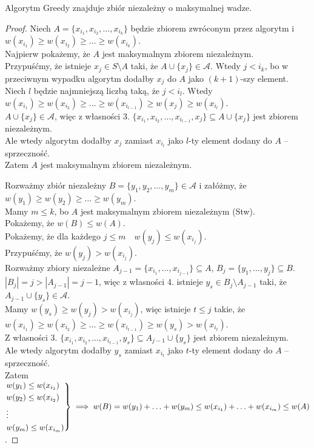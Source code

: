 \begin{theorem}
	Algorytm Greedy znajduje zbiór niezależny o maksymalnej wadze.
\end{theorem}
\begin{proof}
	Niech $A = \{x_{i_1}, x_{i_2}, \ldots, x_{i_k}\}$ będzie zbiorem zwróconym przez algorytm i $w(x_{i_1}) \geq w(x_{i_2}) \geq \ldots \geq w(x_{i_k})$.\\
	Najpierw pokażemy, że $A$ jest maksymalnym zbiorem niezależnym.\\
	Przypuśćmy, że istnieje $x_j \in S \setminus A$ taki, że $A \cup \{x_j\} \in \mathcal{A}$.
	Wtedy $j < i_k$, bo w przeciwnym wypadku algorytm dodałby $x_j$ do $A$ jako $(k+1)$-szy element.\\
	Niech $l$ będzie najmniejszą liczbą taką, że $j < i_l$.
	Wtedy $w(x_{i_1}) \geq w(x_{i_2}) \geq \ldots \geq w(x_{i_{l-1}}) \geq w(x_j) \geq w(x_{i_l})$.\\
	$A \cup \{x_j\} \in \mathcal{A}$, więc z własności 3. $\{x_{i_1}, x_{i_2}, \ldots, x_{i_{l-1}}, x_j\} \subseteq A \cup \{x_j\}$ jest zbiorem niezależnym.\\
	Ale wtedy algorytm dodałby $x_j$ zamiast $x_{i_l}$ jako $l$-ty element dodany do $A$ -- sprzeczność.\\
	Zatem $A$ jest maksymalnym zbiorem niezależnym.
	
	Rozważmy zbiór niezależny $B = \{y_1, y_2, \ldots, y_m\} \in \mathcal{A}$ i załóżmy, że $w(y_1) \geq w(y_2) \geq \ldots \geq w(y_m)$.\\
	Mamy $m \leq k$, bo $A$ jest maksymalnym zbiorem niezależnym (Stw).\\
	Pokażemy, że $w(B) \leq w(A)$.\\
	Pokażemy, że dla każdego $j \leq m \quad w(y_j) \leq w(x_{i_j})$.\\
	Przypuśćmy, że $w(y_j) > w(x_{i_j})$.\\
	Rozważmy zbiory niezależne $A_{j-1} = \{x_{i_1}, \ldots, x_{i_{j-1}}\} \subseteq A$, $B_j = \{y_1, \ldots, y_j\} \subseteq B$.\\
	$|B_j| = j > |A_{j-1}| = j-1$, więc z własności 4. istnieje $y_s \in B_j \setminus A_{j-1}$ taki, że $A_{j-1} \cup \{y_s\} \in \mathcal{A}$.\\
	Mamy $w(y_s) \geq w(y_j) > w(x_{i_j})$, więc istnieje $t \leq j$ takie, że $w(x_{i_1}) \geq w(x_{i_2}) \geq \ldots \geq w(x_{i_{t-1}}) \geq w(y_s) > w(x_{i_t})$.\\
	Z własności 3. $\{x_{i_1}, x_{i_2}, \ldots, x_{i_{t-1}}, y_s\} \subseteq A_{j-1} \cup \{y_s\}$ jest zbiorem niezależnym.\\
	Ale wtedy algorytm dodałby $y_s$ zamiast $x_{i_t}$ jako $t$-ty element dodany do $A$ -- sprzeczność.\\
	Zatem 
	$\begin{rcases}
		w(y_1) \leq w(x_{i_1}) \\
		w(y_2) \leq w(x_{i_2}) \\
		\vdots \\
		w(y_m) \leq w(x_{i_m})
	\end{rcases} \implies w(B) = w(y_1) + \ldots + w(y_m) \leq w(x_{i_1}) + \ldots + w(x_{i_m}) \leq w(A)$.
\end{proof}

